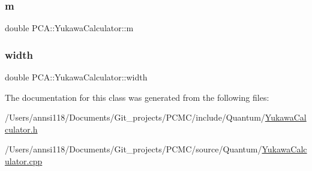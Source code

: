 \subsubsection{\texorpdfstring{m}{m}}
{\footnotesize\ttfamily double P\+C\+A\+::\+Yukawa\+Calculator\+::m\hspace{0.3cm}{\ttfamily [private]}}

\hypertarget{class_p_c_a_1_1_yukawa_calculator_a69e1097584c632e6e43320ef6fc384dc}{}\label{class_p_c_a_1_1_yukawa_calculator_a69e1097584c632e6e43320ef6fc384dc} 
\subsubsection{\texorpdfstring{width}{width}}
{\footnotesize\ttfamily double P\+C\+A\+::\+Yukawa\+Calculator\+::width\hspace{0.3cm}{\ttfamily [private]}}



The documentation for this class was generated from the following files\+:\begin{DoxyCompactItemize}
\item 
/\+Users/annsi118/\+Documents/\+Git\+\_\+projects/\+P\+C\+M\+C/include/\+Quantum/\hyperlink{_yukawa_calculator_8h}{Yukawa\+Calculator.\+h}\item 
/\+Users/annsi118/\+Documents/\+Git\+\_\+projects/\+P\+C\+M\+C/source/\+Quantum/\hyperlink{_yukawa_calculator_8cpp}{Yukawa\+Calculator.\+cpp}\end{DoxyCompactItemize}

